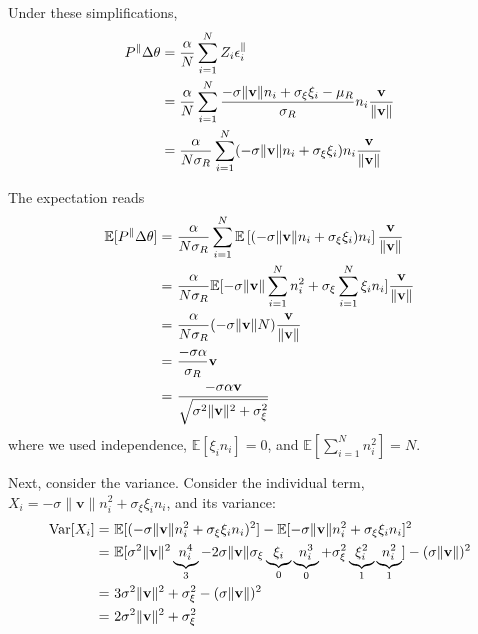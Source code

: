     Under these simplifications,
    \begin{align}
    P^{\parallel}\Delta\theta &= \frac{\alpha}{N} \sum_{i=1}^{N} Z_{i} \epsilon_{i}^{\parallel} \notag\\
    &= \frac{\alpha}{N} \sum_{i=1}^{N} \frac{-\sigma\|\mathbf{v}\| n_{i} + \sigma_{\xi}\xi_{i} - \mu_{R}}{\sigma_{R}} n_{i} \frac{\mathbf{v}}{\|\mathbf{v}\|} \notag\\
    &= \frac{\alpha}{N\sigma_{R}}\sum_{i=1}^{N} (-\sigma\|\mathbf{v}\| n_{i} + \sigma_{\xi}\xi_{i}) n_{i} \frac{\mathbf{v}}{\|\mathbf{v}\|}
    \end{align}
    
    The expectation reads
    \begin{align}
    \mathbb{E}[P^{\parallel}\Delta\theta] =&~ \frac{\alpha}{N\sigma_{R}}\sum_{i=1}^{N} \mathbb{E}\left[ (-\sigma\|\mathbf{v}\| n_{i} + \sigma_{\xi}\xi_{i}) n_{i} \right] \frac{\mathbf{v}}{\|\mathbf{v}\|} \notag\\
    =&~\frac{\alpha}{N\sigma_{R}}\mathbb{E}[ -\sigma\|\mathbf{v}\| \sum_{i=1}^{N} n_{i}^{2} + \sigma_{\xi} \sum_{i=1}^{N}\xi_{i} n_{i} ]\frac{\mathbf{v}}{\|\mathbf{v}\|} \notag\\
    =&~\frac{\alpha}{N\sigma_{R}}(-\sigma\|\mathbf{v}\|N)\frac{\mathbf{v}}{\|\mathbf{v}\|} \notag\\
    =&~\frac{-\sigma\alpha}{\sigma_{R}}\mathbf{v} \notag\\
    =&~\frac{-\sigma\alpha\mathbf{v}}{\sqrt{\sigma^{2}\|\mathbf{v}\|^{2} + \sigma_{\xi}^{2}}}
    \end{align}
    where we used independence, $\mathbb{E}[\xi_{i} n_{i}]=0$, and $\mathbb{E}[\sum_{i=1}^{N} n_{i}^{2}] = N$. 
    
    Next, consider the variance. Consider the individual term, $X_{i} = -\sigma\|\mathbf{v}\| n_{i}^{2} + \sigma_{\xi}\xi_{i} n_{i}$,
    and its variance:
    \begin{align}
    \mathrm{Var}[X_{i}] =&~\mathbb{E}[(-\sigma\|\mathbf{v}\| n_{i}^{2} + \sigma_{\xi}\xi_{i} n_{i})^{2}]
    - \mathbb{E}[-\sigma\|\mathbf{v}\| n_{i}^{2} + \sigma_{\xi} \xi_{i} n_{i}]^{2} \notag\\
    =&~\mathbb{E}[ \sigma^{2}\|\mathbf{v}\|^{2} \underbrace{n_{i}^{4}}_{3}
    - 2\sigma\|\mathbf{v}\|\sigma_{\xi} \underbrace{\xi_{i}}_{0} \underbrace{n_{i}^{3}}_{0}
    + \sigma_{\xi}^{2} \underbrace{\xi_{i}^{2}}_{1} \underbrace{n_{i}^{2}}_{1}
    ] - (\sigma\|\mathbf{v}\|)^{2} \notag\\
    =&~3\sigma^{2}\|\mathbf{v}\|^{2} + \sigma_{\xi}^{2} - (\sigma\|\mathbf{v}\|)^{2} \notag\\
    =&~2\sigma^{2}\|\mathbf{v}\|^{2} + \sigma_{\xi}^{2}
    \end{align}
    
